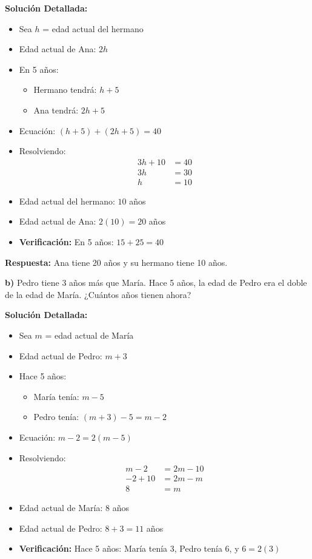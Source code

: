 \textbf{Solución Detallada:}
\begin{itemize}
    \item Sea $h$ = edad actual del hermano
    \item Edad actual de Ana: $2h$
    \item En 5 años:
    \begin{itemize}
        \item Hermano tendrá: $h + 5$
        \item Ana tendrá: $2h + 5$
    \end{itemize}
    \item Ecuación: $(h + 5) + (2h + 5) = 40$
    \item Resolviendo:
    \begin{align*}
    3h + 10 &= 40 \\
    3h &= 30 \\
    h &= 10
    \end{align*}
    \item Edad actual del hermano: $10$ años
    \item Edad actual de Ana: $2(10) = 20$ años
    \item \textbf{Verificación:} En 5 años: $15 + 25 = 40$ \checkmark
\end{itemize}

\textbf{Respuesta:} Ana tiene 20 años y su hermano tiene 10 años.

\medskip

\textbf{b)} Pedro tiene 3 años más que María. Hace 5 años, la edad de Pedro era el doble de la edad de María. ¿Cuántos años tienen ahora?

\textbf{Solución Detallada:}
\begin{itemize}
    \item Sea $m$ = edad actual de María
    \item Edad actual de Pedro: $m + 3$
    \item Hace 5 años:
    \begin{itemize}
        \item María tenía: $m - 5$
        \item Pedro tenía: $(m + 3) - 5 = m - 2$
    \end{itemize}
    \item Ecuación: $m - 2 = 2(m - 5)$
    \item Resolviendo:
    \begin{align*}
    m - 2 &= 2m - 10 \\
    -2 + 10 &= 2m - m \\
    8 &= m
    \end{align*}
    \item Edad actual de María: $8$ años
    \item Edad actual de Pedro: $8 + 3 = 11$ años
    \item \textbf{Verificación:} Hace 5 años: María tenía 3, Pedro tenía 6, y $6 = 2(3)$ \checkmark
\end{itemize}

